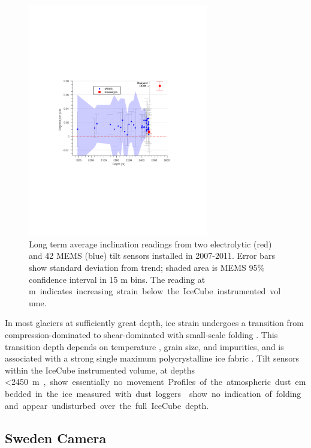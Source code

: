 \begin{figure}[!ht]
	\centering
    \includegraphics[width=0.7\textwidth]{graphics/geometry/tilt4.pdf}
	\caption{Long term average inclination readings from two electrolytic
      (red) and 42 MEMS (blue) tilt sensors installed in 2007-2011.  Error
      bars show standard deviation from trend; shaded area is MEMS 95\%
      confidence interval in 15 m bins.  The reading at \unit[2540]m
      indicates increasing strain below the IceCube instrumented volume.}
	\label{fig:tilt}
\end{figure}

In most glaciers at sufficiently great depth, ice strain undergoes a
transition from compression-dominated to shear-dominated with small-scale
folding \cite{montagnat14,jansen16}.  This transition depth depends on
temperature \cite{price2002temperature}, grain size, and impurities, and is
associated with a strong single maximum polycrystalline ice fabric
\cite{cuffey10}.  Tilt sensors within the IceCube instrumented volume, at
depths \SI{<2450}m, show essentially no movement.  Profiles of the
atmospheric dust embedded in the ice measured with dust loggers \cite{I3:dustlogger} show no
indication of folding and appear undisturbed over the full IceCube depth.

\subsection{Sweden Camera}

